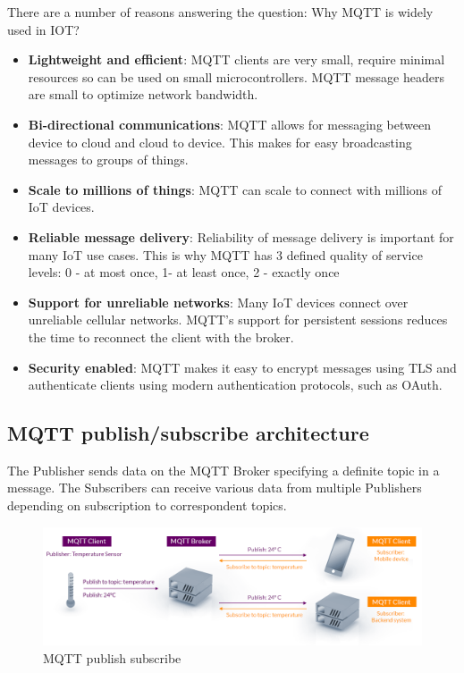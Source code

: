 \documentclass[\main/main.tex]{subfiles}
\begin{document}
There are a number of reasons answering the question: Why MQTT is widely used in IOT? 
\begin{itemize}
    \item \textbf{Lightweight and efficient}: MQTT clients are very small, require minimal resources so can be used on small microcontrollers. MQTT message headers are small to optimize network bandwidth.
    \item \textbf{Bi-directional communications}: MQTT allows for messaging between device to cloud and cloud to device. This makes for easy broadcasting messages to groups of things.
    \item \textbf{Scale to millions of things}: MQTT can scale to connect with millions of IoT devices.
    \item \textbf{Reliable message delivery}: Reliability of message delivery is important for many IoT use cases. This is why MQTT has 3 defined quality of service levels: 0 - at most once, 1- at least once, 2 - exactly once
    \item \textbf{Support for unreliable networks}: Many IoT devices connect over unreliable cellular networks. MQTT’s support for persistent sessions reduces the time to reconnect the client with the broker.
    \item \textbf{Security enabled}: MQTT makes it easy to encrypt messages using TLS and authenticate clients using modern authentication protocols, such as OAuth.
\end{itemize}

\subsection{MQTT publish/subscribe architecture}
The Publisher sends data on the MQTT Broker specifying a definite topic in a message. The Subscribers can receive various data from multiple Publishers depending on subscription to correspondent topics.
\begin{figure}[H]
    \begin{center}
        \includegraphics[scale=0.35]{mqtt-publish-subscribe.png}
    \end{center}
    \caption{MQTT publish subscribe}
    \label{fig:mqtt_publish_subscribe.}
\end{figure}
\end{document}

